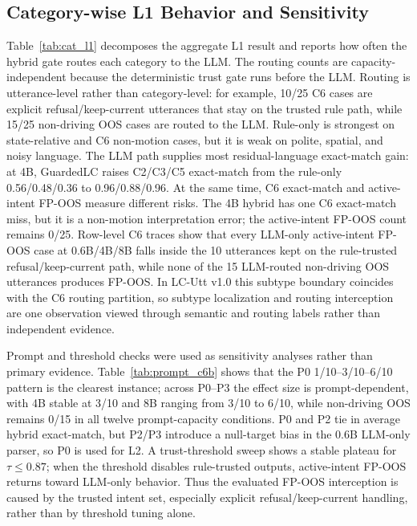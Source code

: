 \documentclass[conference]{IEEEtran}
\newcommand{\ours}{GuardedLC}
\begin{document}




\subsection{Category-wise L1 Behavior and Sensitivity}
\label{sec:prompt}
Table~\ref{tab:cat_l1} decomposes the aggregate L1 result and reports how often the hybrid gate routes each category to the LLM. The routing counts are capacity-independent because the deterministic trust gate runs before the LLM. Routing is utterance-level rather than category-level: for example, 10/25 C6 cases are explicit refusal/keep-current utterances that stay on the trusted rule path, while 15/25 non-driving OOS cases are routed to the LLM. Rule-only is strongest on state-relative and C6 non-motion cases, but it is weak on polite, spatial, and noisy language. The LLM path supplies most residual-language exact-match gain: at 4B, \ours{} raises C2/C3/C5 exact-match from the rule-only 0.56/0.48/0.36 to 0.96/0.88/0.96. At the same time, C6 exact-match and active-intent FP-OOS measure different risks. The 4B hybrid has one C6 exact-match miss, but it is a non-motion interpretation error; the active-intent FP-OOS count remains 0/25. Row-level C6 traces show that every LLM-only active-intent FP-OOS case at 0.6B/4B/8B falls inside the 10 utterances kept on the rule-trusted refusal/keep-current path, while none of the 15 LLM-routed non-driving OOS utterances produces FP-OOS. In LC-Utt v1.0 this subtype boundary coincides with the C6 routing partition, so subtype localization and routing interception are one observation viewed through semantic and routing labels rather than independent evidence.



Prompt and threshold checks were used as sensitivity analyses rather than primary evidence. Table~\ref{tab:prompt_c6b} shows that the P0 1/10--3/10--6/10 pattern is the clearest instance; across P0--P3 the effect size is prompt-dependent, with 4B stable at 3/10 and 8B ranging from 3/10 to 6/10, while non-driving OOS remains 0/15 in all twelve prompt-capacity conditions. P0 and P2 tie in average hybrid exact-match, but P2/P3 introduce a null-target bias in the 0.6B LLM-only parser, so P0 is used for L2. A trust-threshold sweep shows a stable plateau for $\tau\le0.87$; when the threshold disables rule-trusted outputs, active-intent FP-OOS returns toward LLM-only behavior. Thus the evaluated FP-OOS interception is caused by the trusted intent set, especially explicit refusal/keep-current handling, rather than by threshold tuning alone.
\end{document}
